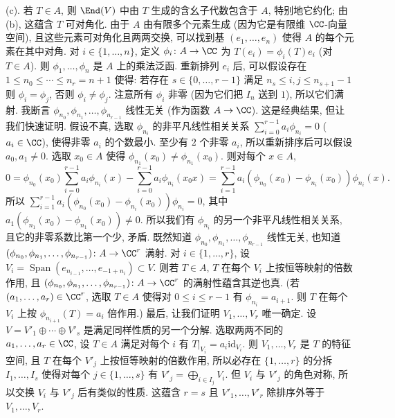 \begin{solution}
(c). 若 $T \in A$, 则 $\End(V)$ 中由 $T$ 生成的含幺子代数包含于 $A$, 特别地它约化; 由 (b), 这蕴含 $T$ 可对角化. 由于 $A$ 由有限多个元素生成 (因为它是有限维 $\CC$-向量空间), 且这些元素可对角化且两两交换, 可以找到基 $(e_1, \ldots, e_n)$ 使得 $A$ 的每个元素在其中对角. 对 $i \in \{1, \ldots, n\}$, 定义 $\phi_i \colon A \to \CC$ 为 $T(e_i) = \phi_i(T)e_i$ (对 $T \in A$). 则 $\phi_1, \ldots, \phi_n$ 是 $A$ 上的乘法泛函. 重新排列 $e_i$ 后, 可以假设存在 $1 \leq n_0 \leq \cdots \leq n_r = n+1$ 使得: 若存在 $s \in \{0, \ldots, r-1\}$ 满足 $n_s \leq i, j \leq n_{s+1} - 1$ 则 $\phi_i = \phi_j$, 否则 $\phi_i \neq \phi_j$. 注意所有 $\phi_i$ 非零 (因为它们把 $I_n$ 送到 $1$), 所以它们满射. 我断言 $\phi_{n_0}, \phi_{n_1}, \ldots, \phi_{n_{r-1}}$ 线性无关 (作为函数 $A \to \CC$). 这是经典结果, 但让我们快速证明. 假设不真, 选取 $\phi_{n_i}$ 的非平凡线性相关关系 $\sum_{i=0}^{r-1}a_i\phi_{n_i} = 0$ ($a_i \in \CC$), 使得非零 $a_i$ 的个数最小. 至少有 $2$ 个非零 $a_i$, 所以重新排序后可以假设 $a_0, a_1 \neq 0$. 选取 $x_0 \in A$ 使得 $\phi_{n_1}(x_0) \neq \phi_{n_1}(x_0)$. 则对每个 $x \in A$,
\[
0 = \phi_{n_0}(x_0)\sum_{i=0}^{r-1}a_i\phi_{n_i}(x) - \sum_{i=0}^{r-1}a_i\phi_{n_i}(x_0x) = \sum_{i=1}^{r-1}a_i(\phi_{n_0}(x_0) - \phi_{n_i}(x_0))\phi_{n_i}(x).
\]
所以 $\sum_{i=1}^{r-1}a_i(\phi_{n_0}(x_0) - \phi_{n_i}(x_0))\phi_{n_i} = 0$, 其中 $a_1(\phi_{n_1}(x_0) - \phi_{n_1}(x_0)) \neq 0$. 所以我们有 $\phi_{n_i}$ 的另一个非平凡线性相关关系, 且它的非零系数比第一个少, 矛盾.
既然知道 $\phi_{n_0}, \phi_{n_1}, \ldots, \phi_{n_{r-1}}$ 线性无关, 也知道 $(\phi_{n_0}, \phi_{n_1}, \ldots, \phi_{n_{r-1}}) \colon A \to \CC^r$ 满射. 对 $i \in \{1, \ldots, r\}$, 设 $V_i = \operatorname{Span}(e_{n_{i-1}}, \ldots, e_{-1+n_i}) \subset V$. 则若 $T \in A$, $T$ 在每个 $V_i$ 上按恒等映射的倍数作用, 且 $(\phi_{n_0}, \phi_{n_1}, \ldots, \phi_{n_{r-1}}) \colon A \to \CC^r$ 的满射性蕴含其逆也真. (若 $(a_1, \ldots, a_r) \in \CC^r$, 选取 $T \in A$ 使得对 $0 \leq i \leq r-1$ 有 $\phi_{n_i} = a_{i+1}$. 则 $T$ 在每个 $V_i$ 上按 $\phi_{n_{i+1}}(T) = a_i$ 倍作用.)
最后, 让我们证明 $V_1, \ldots, V_r$ 唯一确定. 设 $V = V'_1 \oplus \cdots \oplus V'_s$ 是满足同样性质的另一个分解. 选取两两不同的 $a_1, \ldots, a_r \in \CC$, 设 $T \in A$ 满足对每个 $i$ 有 $T|_{V_i} = a_i\mathrm{id}_{V_i}$. 则 $V_1, \ldots, V_r$ 是 $T$ 的特征空间, 且 $T$ 在每个 $V'_j$ 上按恒等映射的倍数作用, 所以必存在 $\{1, \ldots, r\}$ 的分拆 $I_1, \ldots, I_s$ 使得对每个 $j \in \{1, \ldots, s\}$ 有 $V'_j = \bigoplus_{i \in I_j}V_i$. 但 $V_i$ 与 $V'_j$ 的角色对称, 所以交换 $V_i$ 与 $V'_j$ 后有类似的性质. 这蕴含 $r = s$ 且 $V'_1, \ldots, V'_r$ 除排序外等于 $V_1, \ldots, V_r$.


\end{solution}
